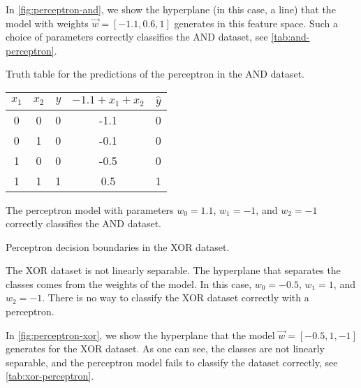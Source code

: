 In \cref{fig:perceptron-and}, we show the hyperplane (in this case, a line) that the model
with weights $\vec{w} = [-1.1, 0.6, 1]$ generates in this feature space. Such a choice
of parameters correctly classifies the AND dataset, see \cref{tab:and-perceptron}.

\begin{tablebox}[label=tab:and-perceptron]{Truth table for the predictions of the perceptron in the AND dataset.}
  \centering
  \begin{tabular}{ccc|cc}
    \toprule
    $x_1$ & $x_2$ & $y$ & $-1.1 + x_1 + x_2$ & $\hat{y}$ \\
    \midrule
    0 & 0 & 0 & -1.1 & 0 \\
    0 & 1 & 0 & -0.1 & 0 \\
    1 & 0 & 0 & -0.5 & 0 \\
    1 & 1 & 1 & 0.5 & 1 \\
    \bottomrule
  \end{tabular}
  \tcblower
  The perceptron model with parameters $w_0 = 1.1$, $w_1 = -1$, and $w_2 = -1$
  correctly classifies the AND dataset.
\end{tablebox}

\begin{figurebox}[label=fig:perceptron-xor]{Perceptron decision boundaries in the XOR
  dataset.}
  \centering
  \tcblower
  The XOR dataset is not linearly separable.
  The hyperplane that separates the classes comes from the weights of the model.
  In this case, $w_0 = -0.5$, $w_1 = 1$, and $w_2 = -1$.
  There is no way to classify the XOR dataset correctly with a perceptron.
\end{figurebox}

In \cref{fig:perceptron-xor}, we show the hyperplane that the model $\vec{w} = [-0.5, 1, -1]$
generates for the XOR dataset.  As one can see, the classes are not linearly separable,
and the perceptron model fails to classify the dataset correctly, see \cref{tab:xor-perceptron}.

